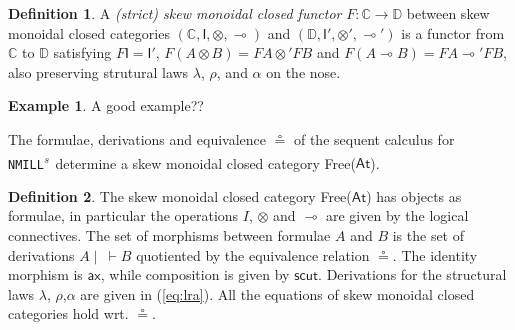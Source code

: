\documentclass[submission,copyright,creativecommons]{eptcs}
\theoremstyle{definition}
\newtheorem{defn}{Definition}[section]
\newtheorem{example}{Example}[section]
\newcommand{\ax}{\mathsf{ax}}
\newcommand{\ot}{\otimes}
\newcommand{\lolli}{\multimap}
\newcommand{\I}{\mathsf{I}}
\newcommand{\NMILL}{\texttt{NMILL}}
\newcommand{\SkNMILL}{\NMILL\textsuperscript{\textit{s}}}
\newcommand{\FSkMCC}{\textsf{Free}}
\begin{document}
\begin{defn}
  A \emph{(strict) skew monoidal closed functor} $F : \mathbb{C} \rightarrow \mathbb{D}$ between skew monoidal closed categories $(\mathbb{C} , \I , \ot , \lolli)$ and $(\mathbb{D} , \I' , \ot' , \lolli')$ is a functor from $\mathbb{C}$ to $\mathbb{D}$ satisfying
    $F \I = \I'$, $F (A \ot B) = F A \ot' F B$ and 
    $F(A \lolli B) = F A \lolli' F B$, also preserving  strutural laws $\lambda$, $\rho$, and $\alpha$ on the nose.
\end{defn}
\begin{example}
A good example??
\end{example}

The formulae, derivations and equivalence $\circeq$ of the sequent calculus for \SkNMILL\ determine a skew monoidal closed category \FSkMCC($\mathsf{At}$).
\begin{defn}\label{def:fskmcc}
  The skew monoidal closed category \FSkMCC($\mathsf{At}$) has
  objects as formulae, in particular the operations $I$, $\ot$ and $\lolli$ are given by the logical connectives. The set of morphisms between formulae $A$ and $B$ is the set of derivations $A \mid ~ \vdash B$ quotiented by the equivalence relation $\circeq$. The identity morphism is $\ax$, while composition is given by $\mathsf{scut}$. Derivations for the structural laws $\lambda$, $\rho$,$\alpha$ are given in (\ref{eq:lra}). All the equations of skew monoidal closed categories hold wrt. $\circeq$.
\end{defn}
\end{document}
